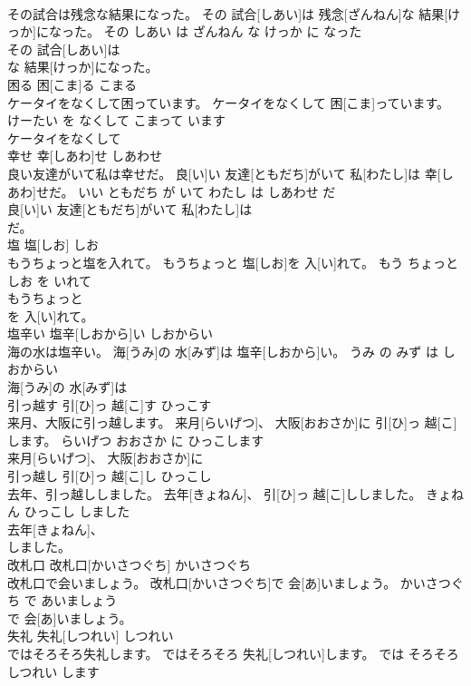 \documentclass[8pt]{extreport}
\begin{document}
\begin{CJK}{UTF8}{min}
\\	その試合は残念な結果になった。	その 試合[しあい]は 残念[ざんねん]な 結果[けっか]になった。	その しあい は ざんねん な けっか に なった	
\\	その 試合[しあい]は
\\	な 結果[けっか]になった。			
\\	困る	困[こま]る	こまる	
\\	ケータイをなくして困っています。	ケータイをなくして 困[こま]っています。	けーたい を なくして こまって います	
\\	ケータイをなくして
\\	幸せ	幸[しあわ]せ	しあわせ	
\\	良い友達がいて私は幸せだ。	良[い]い 友達[ともだち]がいて 私[わたし]は 幸[しあわ]せだ。	いい ともだち が いて わたし は しあわせ だ	
\\	良[い]い 友達[ともだち]がいて 私[わたし]は
\\	だ。			
\\	塩	塩[しお]	しお	
\\	もうちょっと塩を入れて。	もうちょっと 塩[しお]を 入[い]れて。	もう ちょっと しお を いれて	
\\	もうちょっと
\\	を 入[い]れて。			
\\	塩辛い	塩辛[しおから]い	しおからい	
\\	海の水は塩辛い。	海[うみ]の 水[みず]は 塩辛[しおから]い。	うみ の みず は しおからい	
\\	海[うみ]の 水[みず]は
\\	引っ越す	引[ひ]っ 越[こ]す	ひっこす	
\\	来月、大阪に引っ越します。	来月[らいげつ]、 大阪[おおさか]に 引[ひ]っ 越[こ]します。	らいげつ おおさか に ひっこします	
\\	来月[らいげつ]、 大阪[おおさか]に
\\	引っ越し	引[ひ]っ 越[こ]し	ひっこし	
\\	去年、引っ越ししました。	去年[きょねん]、 引[ひ]っ 越[こ]ししました。	きょねん ひっこし しました	
\\	去年[きょねん]、
\\	しました。			
\\	改札口	改札口[かいさつぐち]	かいさつぐち	
\\	改札口で会いましょう。	改札口[かいさつぐち]で 会[あ]いましょう。	かいさつぐち で あいましょう	
\\	で 会[あ]いましょう。			
\\	失礼	失礼[しつれい]	しつれい	
\\	ではそろそろ失礼します。	ではそろそろ 失礼[しつれい]します。	では そろそろ しつれい します	

\end{CJK}
\end{document}
